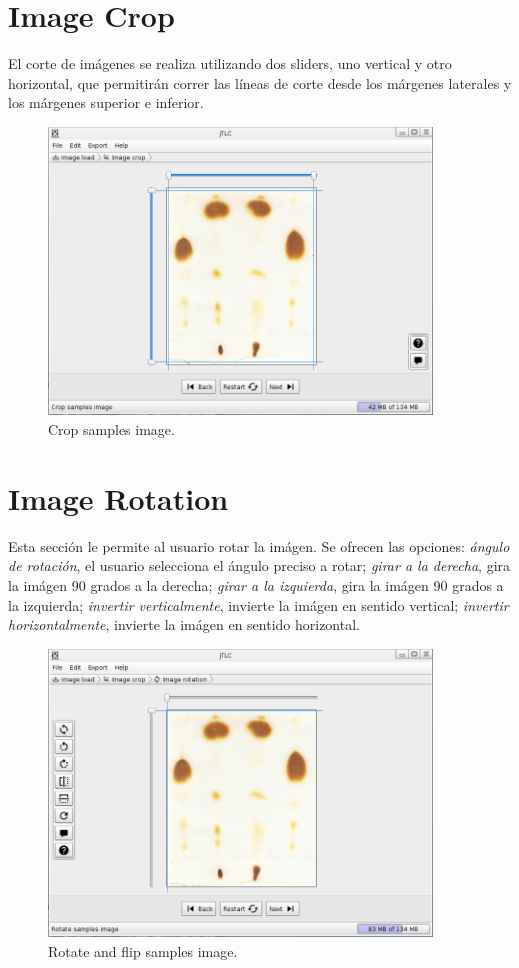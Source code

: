 \section{Image Crop}
El corte de im\'agenes se realiza utilizando dos sliders, uno vertical y otro horizontal, que permitir\'an correr las líneas de corte desde los m\'argenes laterales y los m\'argenes superior e inferior.
\begin{figure}[H]
	\vspace{0cm}
	\centering
	\includegraphics[width=385px]{imagenes/crop}
	\centering
	\vspace{-0.4cm}
	\caption{Crop samples image.}
	\label{fig:image_cut}
	\vspace{-0.25cm}
\end{figure}

\section{Image Rotation}
Esta secci\'on le permite al usuario rotar la im\'agen. Se ofrecen las opciones: \emph{\'angulo de rotaci\'on}, el usuario selecciona el \'angulo preciso a rotar; \emph{girar a la derecha}, gira la im\'agen 90 grados a la derecha; \emph{girar a la izquierda}, gira la im\'agen 90 grados a la izquierda; \emph{invertir verticalmente}, invierte la im\'agen en sentido vertical; \emph{invertir horizontalmente}, invierte la im\'agen en sentido horizontal.
\begin{figure}[H]
	\vspace{0cm}
	\centering
	\includegraphics[width=385px]{imagenes/rotate}
	\centering
	\vspace{-0.4cm}
	\caption{Rotate and flip samples image.}
	\label{fig:image_rot}
	\vspace{-0.25cm}
\end{figure}

